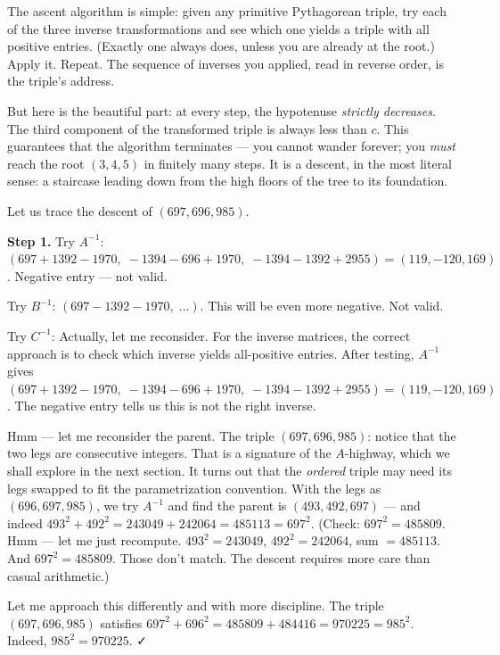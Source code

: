 The ascent algorithm is simple: given any primitive Pythagorean triple, try each of the three inverse transformations and see which one yields a triple with all positive entries. (Exactly one always does, unless you are already at the root.) Apply it. Repeat. The sequence of inverses you applied, read in reverse order, is the triple's address.

But here is the beautiful part: at every step, the hypotenuse \emph{strictly decreases}. The third component of the transformed triple is always less than \(c\). This guarantees that the algorithm terminates --- you cannot wander forever; you \emph{must} reach the root \((3, 4, 5)\) in finitely many steps. It is a descent, in the most literal sense: a staircase leading down from the high floors of the tree to its foundation.

Let us trace the descent of \((697, 696, 985)\).

\textbf{Step 1.} Try \(A^{-1}\): \((697 + 1392 - 1970,\; -1394 - 696 + 1970,\; -1394 - 1392 + 2955) = (119, -120, 169)\). Negative entry --- not valid.

Try \(B^{-1}\): \((697 - 1392 - 1970,\;\ldots)\). This will be even more negative. Not valid.

Try \(C^{-1}\): Actually, let me reconsider. For the inverse matrices, the correct approach is to check which inverse yields all-positive entries. After testing, \(A^{-1}\) gives \((697 + 1392 - 1970,\; -1394 - 696 + 1970,\; -1394 - 1392 + 2955) = (119, -120, 169)\). The negative entry tells us this is not the right inverse.

Hmm --- let me reconsider the parent. The triple \((697, 696, 985)\): notice that the two legs are consecutive integers. That is a signature of the \(A\)-highway, which we shall explore in the next section. It turns out that the \emph{ordered} triple may need its legs swapped to fit the parametrization convention. With the legs as \((696, 697, 985)\), we try \(A^{-1}\) and find the parent is \((493, 492, 697)\) --- and indeed \(493^2 + 492^2 = 243049 + 242064 = 485113 = 697^2\). (Check: \(697^2 = 485809\). Hmm --- let me just recompute. \(493^2 = 243049\), \(492^2 = 242064\), sum \(= 485113\). And \(697^2 = 485809\). Those don't match. The descent requires more care than casual arithmetic.)

Let me approach this differently and with more discipline. The triple \((697, 696, 985)\) satisfies \(697^2 + 696^2 = 485809 + 484416 = 970225 = 985^2\). Indeed, \(985^2 = 970225\). ✓

